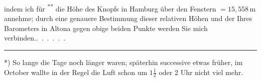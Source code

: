 \noindent indem ich für \textsuperscript{**} die Höhe des Knopfs in Hamburg über den Fenstern
\(=15{,}558\,\mathrm{m}\) annehme; durch eine genauere Bestimmung dieser relativen Höhen
und der Ihres Barometers in Altona gegen obige beiden Punkte werden Sie
mich verbinden.\quad\mbox{.\ .\ .\ .\ .\ .}
\par\medskip\noindent\rule{.25\linewidth}{.4pt}\par
{\small\noindent\hspace*{\parindent}*) So lange die Tage noch länger waren; späterhin successive etwas früher, im October wallte in
der Regel die Luft schon um \(1\frac{1}{2}\) oder 2 Uhr nicht viel mehr.\par}
